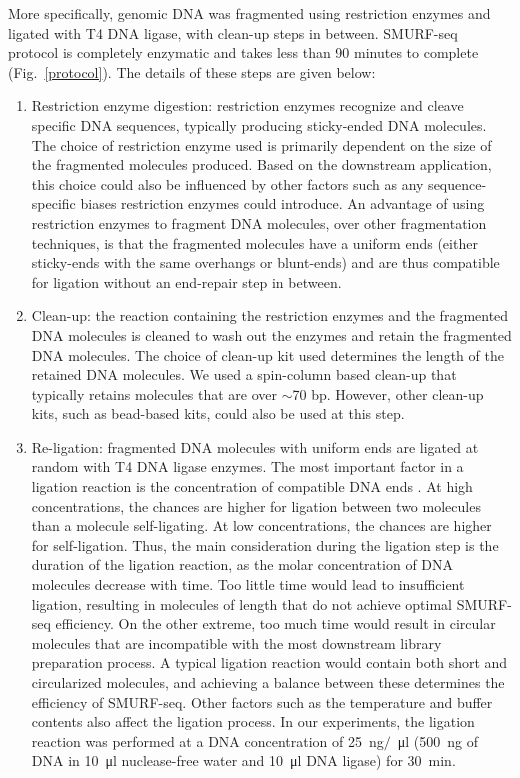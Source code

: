 More specifically, genomic DNA was fragmented using restriction enzymes
and ligated with T4 DNA ligase, with clean-up steps in between.
SMURF-seq protocol is completely enzymatic and takes less than 90
minutes to complete (Fig.~\ref{protocol}).  The details of these steps
are given below:
\begin{enumerate}
\item Restriction enzyme digestion: restriction enzymes recognize
  and cleave specific DNA sequences, typically producing sticky-ended DNA
  molecules.
  The choice of restriction enzyme used is primarily dependent on the
  size of the fragmented molecules produced. Based on the downstream
  application, this choice could also be influenced by other factors such as
  any sequence-specific biases restriction enzymes could introduce.
  An advantage of using restriction enzymes to fragment DNA molecules,
  over other fragmentation techniques, is that the fragmented molecules
  have a uniform ends (either sticky-ends with the same overhangs or
  blunt-ends) and are thus compatible for ligation without an end-repair
  step in between.

\item Clean-up: the reaction containing the restriction enzymes and the
  fragmented DNA molecules is cleaned to wash out the enzymes and retain
  the fragmented DNA molecules. The choice of clean-up kit used determines
  the length of the retained DNA molecules. We used a spin-column
  based clean-up that typically retains molecules that are over $\sim$70
  bp. However, other clean-up kits, such as bead-based kits, could also be
  used at this step.

\item Re-ligation: fragmented DNA molecules with uniform ends are
  ligated at random with T4 DNA ligase enzymes.
  The most important factor in a ligation reaction is the
  concentration of compatible DNA ends \citep{dugaiczyk1975ligation}. At
  high concentrations, the chances are higher for ligation between two
  molecules than a molecule self-ligating. At low concentrations, the
  chances are higher for self-ligation.
  Thus, the main consideration during the ligation step is the
  duration of the ligation reaction, as the molar concentration of DNA
  molecules decrease with time. Too little time would lead to insufficient
  ligation, resulting in molecules of length that do not achieve optimal
  SMURF-seq efficiency. On the other extreme, too much time would result
  in circular molecules that are incompatible with the most downstream
  library preparation process. A typical ligation reaction would contain
  both short and circularized molecules, and achieving a balance between
  these determines the efficiency of SMURF-seq.
  Other factors such as the temperature and buffer contents also affect
  the ligation process.
  In our experiments, the ligation reaction was performed at a DNA
  concentration of \SI{25}{\nano\gram}$/$\SI{}{\micro\litre}
  (\SI{500}{\nano\gram} of DNA in \SI{10}{\micro\litre} nuclease-free
  water and \SI{10}{\micro\litre} DNA ligase) for \SI{30}{\minute}.


\end{enumerate}

